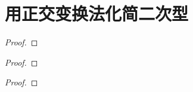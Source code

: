 \documentclass[../../main.tex]{subfiles}%
\begin{document}
\section{用正交变换法化简二次型}

\begin{proposition}\label{proposition:例9.48}

\end{proposition}
\begin{proof}

\end{proof}

\begin{proposition}\label{proposition:例9.49}

\end{proposition}
\begin{proof}

\end{proof}

\begin{proposition}\label{proposition:例9.50}

\end{proposition}
\begin{proof}

\end{proof}
\end{document}
